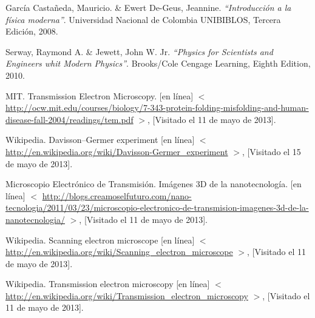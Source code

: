 \documentclass[11pt,graphicx,caption,rotating]{article}
\begin{document}

\begin{thebibliography}{99}

 García Castañeda, Mauricio. \& Ewert De-Geus, Jeannine.
{\em "`Introducción a la física moderna"'}.
Universidad Nacional de Colombia UNIBIBLOS, Tercera Edición, 2008.

 Serway, Raymond A. \& Jewett, John W. Jr.
{\em "`Physics for Scientists and Engineers whit Modern Physics"'}.
Brooks/Cole Cengage Learning, Eighth Edition, 2010.

 MIT. Transmission Electron Microscopy.  [en línea] $<$ \url{http://ocw.mit.edu/courses/biology/7-343-protein-folding-misfolding-and-human-disease-fall-2004/readings/tem.pdf} $>$, [Visitado el 11 de mayo de 2013].

 Wikipedia. Davisson–Germer experiment [en línea] $<$ \url{http://en.wikipedia.org/wiki/Davisson-Germer_experiment} $>$, [Visitado el 15 de mayo de 2013].

 Microscopio Electrónico de Transmisión. Imágenes 3D de la nanotecnología. [en línea] $<$ \url{http://blogs.creamoselfuturo.com/nano-tecnologia/2011/03/23/microscopio-electronico-de-transmision-imagenes-3d-de-la-nanotecnologia/} $>$, [Visitado el 11 de mayo de 2013].

 Wikipedia. Scanning electron microscope [en línea] $<$ \url{http://en.wikipedia.org/wiki/Scanning_electron_microscope} $>$, [Visitado el 11 de mayo de 2013].

 Wikipedia. Transmission electron microscopy [en línea] $<$ \url{http://en.wikipedia.org/wiki/Transmission_electron_microscopy} $>$, [Visitado el 11 de mayo de 2013].
\end{thebibliography}
\end{document}
